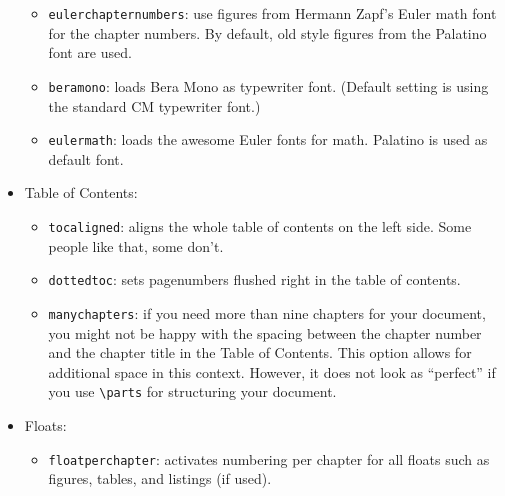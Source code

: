 \begin{itemize}
\begin{itemize}
            \item\texttt{eulerchapternumbers}: use figures from Hermann Zapf's
            Euler math font for the chapter numbers. By default, old style
            figures from the Palatino font are used.

            \item\texttt{beramono}: loads Bera Mono as typewriter font.
            (Default setting is using the standard CM typewriter font.)

            \item\texttt{eulermath}: loads the awesome Euler fonts for math.
            Pala\-tino is used as default font.

        \end{itemize}


    \item Table of Contents:
        \begin{itemize}
            \item\texttt{tocaligned}: aligns the whole table of contents on
            the left side. Some people like that, some don't.

            \item\texttt{dottedtoc}: sets pagenumbers flushed right in the
            table of contents.

            \item\texttt{manychapters}: if you need more than nine chapters for
            your document, you might not be happy with the spacing between the
            chapter number and the chapter title in the Table of Contents.
            This option allows for additional space in this context.
            However, it does not look as ``perfect'' if you use
            \verb|\parts| for structuring your document.
        \end{itemize}

    \item Floats:
        \begin{itemize}

            \item\texttt{floatperchapter}: activates numbering per chapter for
            all floats such as figures, tables, and listings (if used).
        \end{itemize}


\end{itemize}
